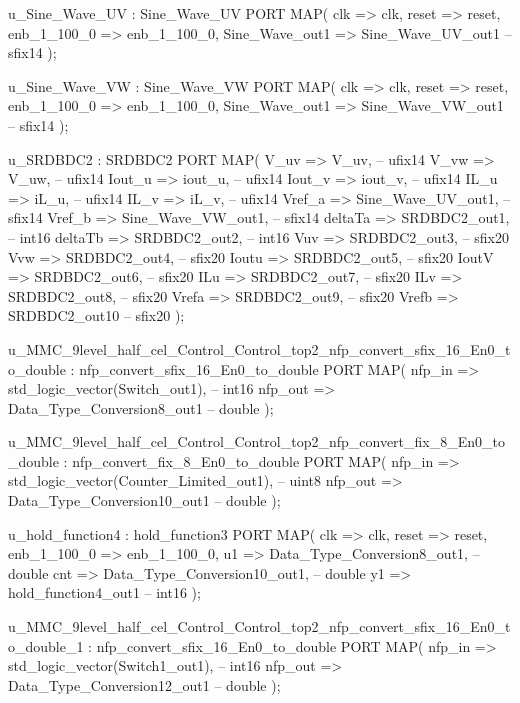 \begin{mylisting}[language=VHDL,caption=MSSRDCDB制御\&SVPWMモジュール,label=appF_Control_top2_module_VHDL]
  u_Sine_Wave_UV : Sine_Wave_UV
    PORT MAP( clk => clk,
              reset => reset,
              enb_1_100_0 => enb_1_100_0,
              Sine_Wave_out1 => Sine_Wave_UV_out1  -- sfix14
              );

  u_Sine_Wave_VW : Sine_Wave_VW
    PORT MAP( clk => clk,
              reset => reset,
              enb_1_100_0 => enb_1_100_0,
              Sine_Wave_out1 => Sine_Wave_VW_out1  -- sfix14
              );

  u_SRDBDC2 : SRDBDC2
    PORT MAP( V_uv => V_uv,  -- ufix14
              V_vw => V_uw,  -- ufix14
              Iout_u => iout_u,  -- ufix14
              Iout_v => iout_v,  -- ufix14
              IL_u => iL_u,  -- ufix14
              IL_v => iL_v,  -- ufix14
              Vref_a => Sine_Wave_UV_out1,  -- sfix14
              Vref_b => Sine_Wave_VW_out1,  -- sfix14
              deltaTa => SRDBDC2_out1,  -- int16
              deltaTb => SRDBDC2_out2,  -- int16
              Vuv => SRDBDC2_out3,  -- sfix20
              Vvw => SRDBDC2_out4,  -- sfix20
              Ioutu => SRDBDC2_out5,  -- sfix20
              IoutV => SRDBDC2_out6,  -- sfix20
              ILu => SRDBDC2_out7,  -- sfix20
              ILv => SRDBDC2_out8,  -- sfix20
              Vrefa => SRDBDC2_out9,  -- sfix20
              Vrefb => SRDBDC2_out10  -- sfix20
              );

  u_MMC_9level_half_cel_Control_Control_top2_nfp_convert_sfix_16_En0_to_double : nfp_convert_sfix_16_En0_to_double
    PORT MAP( nfp_in => std_logic_vector(Switch_out1),  -- int16
              nfp_out => Data_Type_Conversion8_out1  -- double
              );

  u_MMC_9level_half_cel_Control_Control_top2_nfp_convert_fix_8_En0_to_double : nfp_convert_fix_8_En0_to_double
    PORT MAP( nfp_in => std_logic_vector(Counter_Limited_out1),  -- uint8
              nfp_out => Data_Type_Conversion10_out1  -- double
              );

  u_hold_function4 : hold_function3
    PORT MAP( clk => clk,
              reset => reset,
              enb_1_100_0 => enb_1_100_0,
              u1 => Data_Type_Conversion8_out1,  -- double
              cnt => Data_Type_Conversion10_out1,  -- double
              y1 => hold_function4_out1  -- int16
              );

  u_MMC_9level_half_cel_Control_Control_top2_nfp_convert_sfix_16_En0_to_double_1 : nfp_convert_sfix_16_En0_to_double
    PORT MAP( nfp_in => std_logic_vector(Switch1_out1),  -- int16
              nfp_out => Data_Type_Conversion12_out1  -- double
              );


\end{mylisting}
